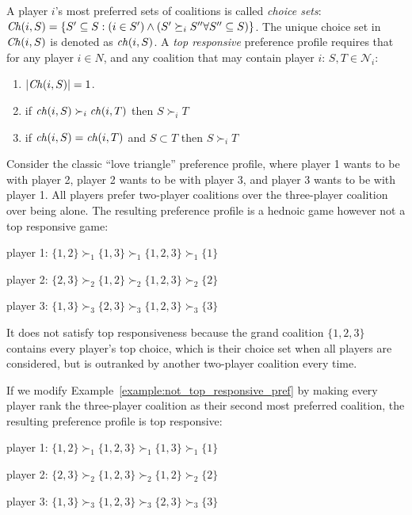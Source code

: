 A player $i$'s most preferred sets of coalitions is called \textit{choice sets}:
$\mathit{Ch}(i, S) = \{S' \subseteq S: (i \in S') \wedge (S' \succeq_i S'' \forall S'' \subseteq S)\}$.
The unique choice set in $\mathit{Ch}(i, S)$ is denoted as $\mathit{ch}(i, S)$.
A {\em top responsive} preference profile requires that for any player $i \in N$,
and any coalition that may contain player $i$: $S, T \in \mathcal{N}_i$:
\begin{enumerate}
  \item $|\mathit{Ch}(i, S)| = 1$.
  \item if $\mathit{ch}(i, S) \succ_i \mathit{ch}(i, T)$ then $S \succ_i T$
  \item if $\mathit{ch}(i, S) = \mathit{ch}(i, T)$ and $S \subset T$ then $S \succ_i T$
\end{enumerate}

\begin{example}
\label{example:not_top_responsive_pref}
  Consider the classic ``love triangle'' preference profile, where player 1 wants
  to be with player 2, player 2 wants to be with player 3, and player 3 wants to
  be with player 1. All players prefer two-player coalitions over the three-player
  coalition over being alone.
  The resulting preference profile is a hednoic game however not a top responsive
  game:

  player 1: $\{1, 2\} \succ_1 \{1, 3\} \succ_1 \{1, 2, 3\} \succ_1  \{1\}$

  player 2: $\{2, 3\} \succ_2 \{1, 2\} \succ_2 \{1, 2, 3\} \succ_2  \{2\}$

  player 3: $\{1, 3\} \succ_3 \{2, 3\} \succ_3 \{1, 2, 3\} \succ_3  \{3\}$

  It does not satisfy top responsiveness because the grand coalition $\{1, 2, 3\}$
  contains every player's top choice, which is their choice set when all players
  are considered, but is outranked by another two-player coalition every time.
\end{example}

\begin{example}
\label{example:top_responsive_pref}
  If we modify Example~\ref{example:not_top_responsive_pref} by making every player
  rank the three-player coalition as their second most preferred coalition, the
  resulting preference profile is top responsive:

  player 1: $\{1, 2\} \succ_1 \{1, 2, 3\} \succ_1 \{1, 3\} \succ_1  \{1\}$

  player 2: $\{2, 3\} \succ_2 \{1, 2, 3\} \succ_2 \{1, 2\} \succ_2  \{2\}$

  player 3: $\{1, 3\} \succ_3 \{1, 2, 3\} \succ_3 \{2, 3\} \succ_3  \{3\}$

\end{example}

